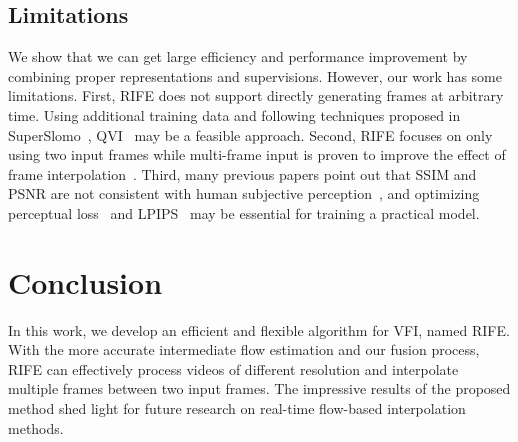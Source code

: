 \documentclass[10pt,twocolumn,letterpaper]{article}
\begin{document}
\subsection{Limitations}
\label{sec:limitation}
We show that we can get large efficiency and performance improvement by combining proper representations and supervisions. However, our work has some limitations. First, RIFE does not support directly generating frames at arbitrary time. Using additional training data and following techniques proposed in SuperSlomo~\cite{jiang2018super}, QVI~\cite{xu2019quadratic} may be a feasible approach. Second, RIFE focuses on only using two input frames while multi-frame input is proven to improve the effect of frame interpolation~\cite{xu2019quadratic, liu2020enhanced, kalluri2020flavr}. Third, many previous papers point out that SSIM and PSNR are not consistent with human subjective perception~\cite{niklaus2017video, niklaus2020softmax}, and optimizing perceptual loss~\cite{johnson2016perceptual} and LPIPS~\cite{zhang2018unreasonable} may be essential for training a practical model.  	\section{Conclusion}
In this work, we develop an efficient and flexible algorithm for VFI, named RIFE. With the more accurate intermediate flow estimation and our fusion process, RIFE can effectively process videos of different resolution and interpolate multiple frames between two input frames. The impressive results of the proposed method shed light for future research on real-time flow-based interpolation methods. 
{\small


}
\end{document}

